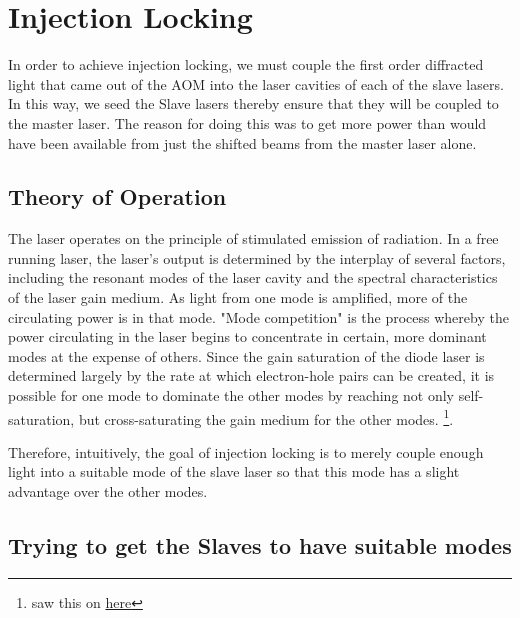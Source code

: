  \chapter{Injection Locking}


In order to achieve injection locking, we must couple the first order diffracted light that came out of the AOM into the laser cavities of each of the slave lasers. In this way, we seed the Slave lasers thereby ensure that they will be coupled to the master laser. 
The reason for doing this was to get more power than would have been available from just the shifted beams from the master laser alone. 

\section{Theory of Operation}


The laser operates on the principle of stimulated emission of radiation. In a free running laser, the laser's output is determined by the interplay of several factors, including the resonant modes of the laser cavity and the spectral characteristics of the laser gain medium. As light from one mode is amplified, more of the circulating power is in that mode. 
"Mode competition" is the process whereby the power circulating in the laser begins to concentrate in certain, more dominant modes at the expense of others. Since the gain saturation of the diode laser is determined largely by the rate at which electron-hole pairs can be created, it is possible for one mode to dominate the other modes by reaching not only self-saturation, but cross-saturating the gain medium for the other modes. \footnote{saw this on \href{<http://www.rp-photonics.com/gain_saturation.html>}{here}}. 

Therefore, intuitively, the goal of injection locking is to merely couple enough light into a suitable mode of the slave laser so that this mode has a slight advantage over the other modes. 

\section{Trying to get the Slaves to have suitable modes}

